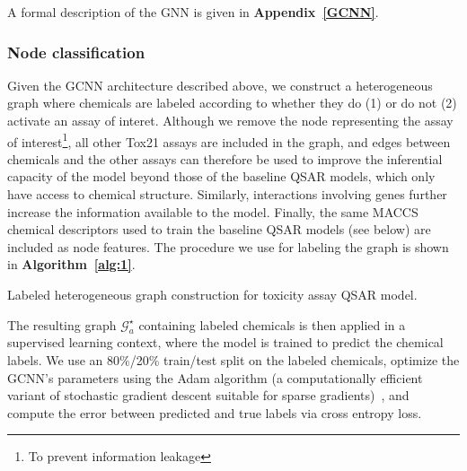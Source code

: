 \documentclass{ws-procs11x85}
\begin{document}
A formal description of the GNN is given in \textbf{Appendix~\ref{GCNN}}.

\subsubsection{Node classification}\label{methods-nc}
Given the GCNN architecture described above, we construct a heterogeneous graph where chemicals are labeled according to whether they do (1) or do not (2) activate an assay of interet.
Although we remove the node representing the assay of interest\footnote{To prevent information leakage}, all other Tox21 assays are included in the graph, and edges between chemicals and the other assays can therefore be used to improve the inferential capacity of the model beyond those of the baseline QSAR models, which only have access to chemical structure.
Similarly, interactions involving genes further increase the information available to the model.
Finally, the same MACCS chemical descriptors used to train the baseline QSAR models (see below) are included as node features.
The procedure we use for labeling the graph is shown in \textbf{Algorithm~\ref{alg:1}}.

\begin{algorithm}
\caption{Labeled heterogeneous graph construction for toxicity assay QSAR model.}\label{alg:1}
\begin{algorithmic}
   \Else
   \EndIf
\EndFor
{}
\end{algorithmic}
\end{algorithm}

The resulting graph $\mathcal{G}_a^\star$ containing labeled chemicals is then applied in a supervised learning context, where the model is trained to predict the chemical labels.
We use an 80\%/20\% train/test split on the labeled chemicals, optimize the GCNN's parameters using the Adam algorithm (a computationally efficient variant of stochastic gradient descent suitable for sparse gradients)~\cite{kingma2014adam}, and compute the error between predicted and true labels via cross entropy loss.
\end{document}
